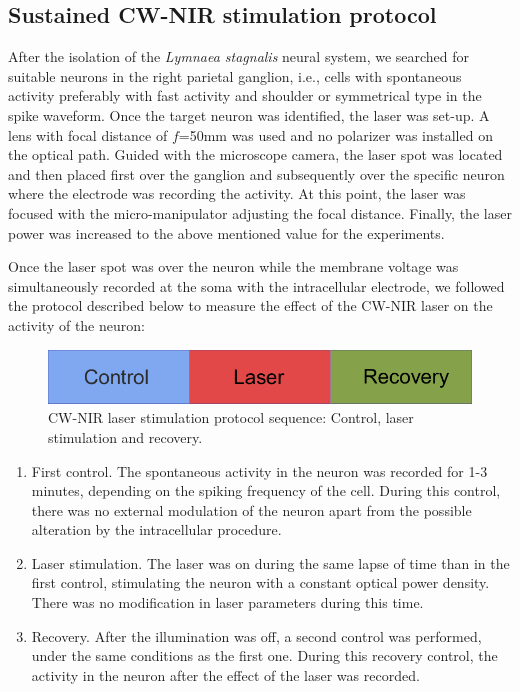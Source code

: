 \subsection{Sustained CW-NIR stimulation protocol}
\label{sect:sustained-protocol}
After the isolation of the \textit{Lymnaea stagnalis} neural system, we searched for suitable neurons in the right parietal ganglion, i.e., cells with spontaneous activity preferably with fast activity and shoulder or symmetrical type in the spike waveform. 
Once the target neuron was identified, the laser was set-up. A lens with focal distance of $f$=50mm was used and no polarizer was installed on the optical path. Guided with the microscope camera, the laser spot was located and then placed first over the ganglion and subsequently over the specific neuron where the electrode was recording the activity. 
At this point, the laser was focused with the micro-manipulator adjusting the focal distance. Finally, the laser power was increased to the above mentioned value for the experiments.

Once the laser spot was over the neuron while the membrane voltage was simultaneously recorded at the soma with the intracellular electrode, we followed the protocol described below to measure the effect of the CW-NIR laser on the activity of the neuron:

\begin{figure}[htb!]
	\includegraphics[width=\textwidth]{img/laser/trial-protocol.pdf}
	\caption{CW-NIR laser stimulation protocol sequence: Control, laser stimulation and recovery.}
	\label{fig:protocol scheme}
\end{figure}

\begin{enumerate}
	\item First control. The spontaneous activity in the neuron was recorded for 1-3 minutes, depending on the spiking frequency of the cell. During this control, there was no external modulation of the neuron apart from the possible alteration by the intracellular procedure.  
	\item Laser stimulation. The laser was on during the same lapse of time than in the first control, stimulating the neuron with a constant optical power density. There was no modification in laser parameters during this time.
	\item Recovery. After the illumination was off, a second control was performed, under the same conditions as the first one. During this recovery control, the activity in the neuron after the effect of the laser was recorded.
\end{enumerate}



